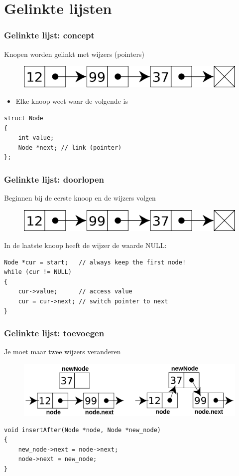 \documentclass[12pt]{beamer}
\begin{document}
\section{Gelinkte lijsten}

\begin{frame}[fragile]
\frametitle{Gelinkte lijst: concept}
Knopen worden gelinkt met wijzers (pointers)
\begin{figure}
\centering
\includegraphics[width=.8\textwidth]{img/singly-linked}
\end{figure}
\begin{itemize}
\item Elke knoop weet waar de volgende is
\end{itemize}
\begin{lstlisting}
struct Node
{
    int value;
    Node *next; // link (pointer)
};
\end{lstlisting}
\end{frame}

\begin{frame}[fragile]
\frametitle{Gelinkte lijst: doorlopen}
Beginnen bij de eerste knoop en de wijzers volgen
\begin{figure}
\centering
\includegraphics[width=.6\textwidth]{img/singly-linked}
\end{figure}
In de laatste knoop heeft de wijzer de waarde NULL:
\begin{lstlisting}
Node *cur = start;   // always keep the first node!
while (cur != NULL)
{
    cur->value;      // access value
    cur = cur->next; // switch pointer to next
}
\end{lstlisting}
\end{frame}

\begin{frame}[fragile]
\frametitle{Gelinkte lijst: toevoegen}
Je moet maar twee wijzers veranderen
\begin{figure}
\centering
\includegraphics[width=.9\textwidth]{img/insert-node}
\end{figure}
\begin{lstlisting}
void insertAfter(Node *node, Node *new_node)
{
    new_node->next = node->next;
    node->next = new_node;
}
\end{lstlisting}
\end{frame}
\end{document}
